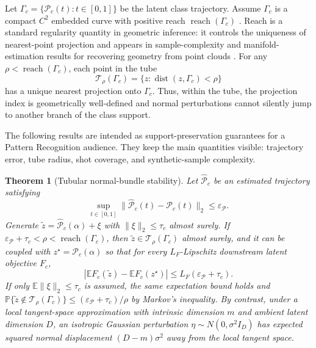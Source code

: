 \documentclass{article}
\newtheorem{theorem}{Theorem}
\begin{document}
Let $\Gamma_c=\{\mathcal{P}_c(t):t\in[0,1]\}$ be the latent class trajectory. Assume $\Gamma_c$ is a compact $C^2$ embedded curve with positive reach $\operatorname{reach}(\Gamma_c)$ \citep{federer1959curvature}. Reach is a standard regularity quantity in geometric inference: it controls the uniqueness of nearest-point projection and appears in sample-complexity and manifold-estimation results for recovering geometry from point clouds \citep{niyogi2008finding, genovese2012manifold, aamari2019nonasymptotic}. For any $\rho<\operatorname{reach}(\Gamma_c)$, each point in the tube
\[
	\mathcal{T}_\rho(\Gamma_c)=\{z:\operatorname{dist}(z,\Gamma_c)<\rho\}
\]
has a unique nearest projection onto $\Gamma_c$. Thus, within the tube, the projection index is geometrically well-defined and normal perturbations cannot silently jump to another branch of the class support.

The following results are intended as support-preservation guarantees for a Pattern Recognition audience. They keep the main quantities visible: trajectory error, tube radius, shot coverage, and synthetic-sample complexity.

\begin{theorem}[Tubular normal-bundle stability]
	Let $\widehat{\mathcal{P}}_c$ be an estimated trajectory satisfying
	\[
	\sup_{t\in[0,1]}\lVert\widehat{\mathcal{P}}_c(t)-\mathcal{P}_c(t)\rVert_2\le \varepsilon_{\mathcal{P}}.
	\]
	Generate $\tilde z=\widehat{\mathcal{P}}_c(\alpha)+\xi$ with $\lVert\xi\rVert_2\le\tau_c$ almost surely. If $\varepsilon_{\mathcal{P}}+\tau_c<\rho<\operatorname{reach}(\Gamma_c)$, then $\tilde z\in\mathcal{T}_\rho(\Gamma_c)$ almost surely, and it can be coupled with $z^\star=\mathcal{P}_c(\alpha)$ so that for every $L_F$-Lipschitz downstream latent objective $F_c$,
	\[
	\left|\mathbb{E}F_c(\tilde z)-\mathbb{E}F_c(z^\star)\right|
	\le L_F(\varepsilon_{\mathcal{P}}+\tau_c).
	\]
	If only $\mathbb{E}\lVert\xi\rVert_2\le\tau_c$ is assumed, the same expectation bound holds and $\mathbb{P}\{\tilde z\notin\mathcal{T}_\rho(\Gamma_c)\}\le(\varepsilon_{\mathcal{P}}+\tau_c)/\rho$ by Markov's inequality. By contrast, under a local tangent-space approximation with intrinsic dimension $m$ and ambient latent dimension $D$, an isotropic Gaussian perturbation $\eta\sim N(0,\sigma^2 I_D)$ has expected squared normal displacement $(D-m)\sigma^2$ away from the local tangent space.
\end{theorem}
\end{document}
